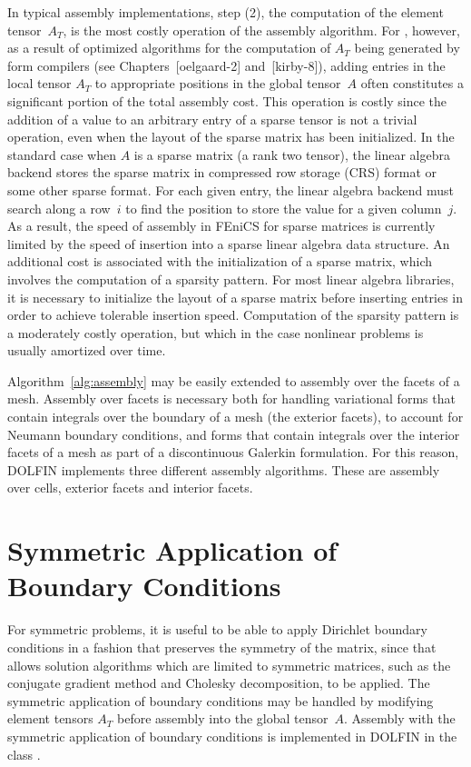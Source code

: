 In typical assembly implementations, step (2), the computation of the
element tensor~$A_T$, is the most costly operation of the assembly
algorithm. For \dolfin{}, however, as a result of optimized algorithms
for the computation of $A_T$ being generated by form compilers (see
Chapters~[oelgaard-2] and~[kirby-8]), adding entries in
the local tensor $A_T$ to appropriate positions in the global
tensor~$A$ often constitutes a significant portion of the total assembly
cost. This operation is costly since the addition of a value to an
arbitrary entry of a sparse tensor is not a trivial operation, even when
the layout of the sparse matrix has been initialized.  In the standard
case when $A$ is a sparse matrix (a rank two tensor), the linear
algebra backend stores the sparse matrix in compressed row storage
(CRS) format or some other sparse format. For each given entry, the
linear algebra backend must search along a row~$i$ to find the
position to store the value for a given column~$j$. As a result, the
speed of assembly in FEniCS for sparse matrices is currently limited
by the speed of insertion into a sparse linear algebra data
structure. An additional cost is associated with the initialization of
a sparse matrix, which involves the computation of a sparsity
pattern. For most linear algebra libraries, it is necessary to
initialize the layout of a sparse matrix before inserting entries in
order to achieve tolerable insertion speed.  Computation of the
sparsity pattern is a moderately costly operation, but which in the
case nonlinear problems is usually amortized over time.

Algorithm~\ref{alg:assembly} may be easily extended to assembly over
the facets of a mesh. Assembly over facets is necessary both for
handling variational forms that contain integrals over the boundary of
a mesh (the exterior facets), to account for Neumann boundary
conditions, and forms that contain integrals over the interior facets
of a mesh as part of a discontinuous Galerkin formulation. For this
reason, DOLFIN implements three different assembly algorithms. These
are assembly over cells, exterior facets and interior facets.

\section{Symmetric Application of Boundary Conditions}

For symmetric problems, it is useful to be able to apply Dirichlet
boundary conditions in a fashion that preserves the symmetry of the
matrix, since that allows solution algorithms which are limited to
symmetric matrices, such as the conjugate gradient method and Cholesky
decomposition, to be applied.  The symmetric application of boundary
conditions may be handled by modifying element tensors $A_T$ before
assembly into the global tensor~$A$.
Assembly with the symmetric application of boundary conditions is
implemented in DOLFIN in the class .

